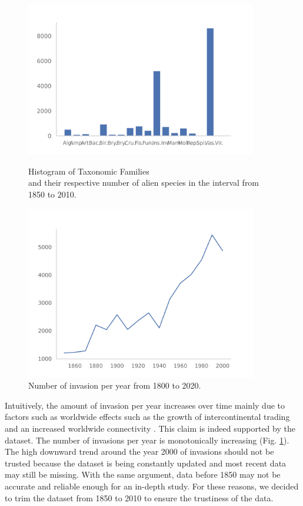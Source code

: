 \documentclass[mscthesis]{usiinfthesis}
\begin{document}
\begin{figure}[H]
\centering
\begin{minipage}{.55\textwidth}
    \centering
    \includegraphics[width=0.9\textwidth]{histogram_taxfam}
    \caption{Histogram of Taxonomic Families \\ and their respective number of alien species in the interval from 1850 to 2010.}
    \label{fig:hist_tax_fam}
\end{minipage}%
\begin{minipage}{.55\textwidth}
    \centering
    \includegraphics[width=0.9\textwidth]{invasion_per_year.png}
    \caption{Number of invasion per year from 1800 to 2020.}
    \label{fig:invasion_per_year}
\end{minipage}
\end{figure}

\noindent Intuitively, the amount of invasion per year increases over time mainly due to factors such as worldwide effects such as the growth of intercontinental trading and an increased worldwide connectivity \cite{intro:ecological}. This claim is indeed supported by the dataset. The number of invasions per year is monotonically increasing (Fig. \ref{fig:invasion_per_year}). The high downward trend around the year 2000 of invasions should not be trusted because the dataset is being constantly updated and most recent data may still be missing. With the same argument, data before 1850 may not be accurate and reliable enough for an in-depth study. For these reasons, we decided to trim the dataset from 1850 to 2010 to ensure the trustiness of the data. 
\end{document}
